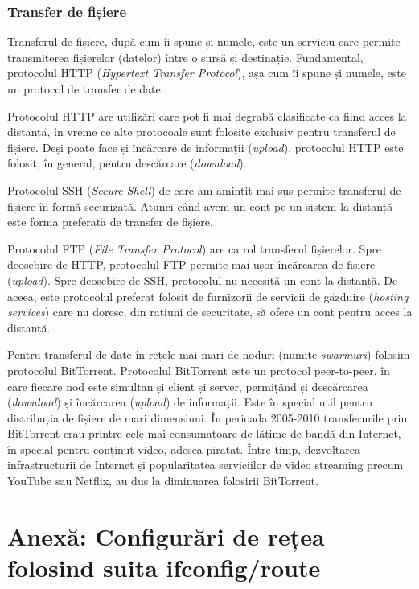 \subsubsection{Transfer de fișiere}
\label{sec:net:apps:other:file-transfer}

Transferul de fișiere, după cum îi spune și numele, este un serviciu care permite transmiterea fișierelor (datelor) între o sursă și destinație.
Fundamental, protocolul HTTP (\textit{Hypertext Transfer Protocol}), așa cum îi spune și numele, este un protocol de transfer de date.

Protocolul HTTP are utilizări care pot fi mai degrabă clasificate ca fiind acces la distanță, în vreme ce alte protocoale sunt folosite exclusiv pentru transferul de fișiere.
Deși poate face și încărcare de informații (\textit{upload}), protocolul HTTP este folosit, în general, pentru descărcare (\textit{download}).

Protocolul SSH (\textit{Secure Shell}) de care am amintit mai sus permite transferul de fișiere în formă securizată.
Atunci când avem un cont pe un sistem la distanță este forma preferată de transfer de fișiere.

Protocolul FTP  (\textit{File Transfer Protocol}) are ca rol transferul fișierelor.
Spre deosebire de HTTP, protocolul FTP permite mai ușor încărcarea de fișiere (\textit{upload}).
Spre deosebire de SSH, protocolul nu necesită un cont la distanță.
De aceea, este protocolul preferat folosit de furnizorii de servicii de găzduire (\textit{hosting services}) care nu doresc, din rațiuni de securitate, să ofere un cont pentru acces la distanță.

Pentru transferul de date în rețele mai mari de noduri (numite \textit{swarmuri}) folosim protocolul BitTorrent.
Protocolul BitTorrent este un protocol peer-to-peer, în care fiecare nod este simultan și client și server, permițând și descărcarea (\textit{download}) și încărcarea (\textit{upload}) de informații.
Este în special util pentru distribuția de fișiere de mari dimensiuni.
În perioada 2005-2010 transferurile prin BitTorrent erau printre cele mai consumatoare de lățime de bandă din Internet, în special pentru conținut video, adesea piratat.
Între timp, dezvoltarea infrastructurii de Internet și popularitatea serviciilor de video streaming precum YouTube sau Netflix, au dus la diminuarea folosirii BitTorrent.

\section{Anexă: Configurări de rețea folosind suita ifconfig/route}
\label{sec:net:config-ifconfig}

